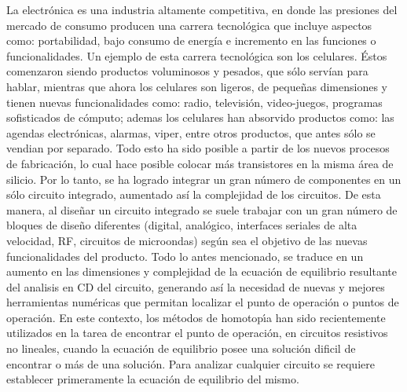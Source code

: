 \documentclass[conference,letterpaper,onecolumn]{IEEEtran}
\begin{document}
La electr\'onica es una industria altamente competitiva, en donde las presiones del mercado de consumo producen
una carrera tecnol\'ogica que incluye aspectos como: portabilidad, bajo consumo de energ{\'i}a e incremento en las funciones
o funcionalidades. Un ejemplo de esta carrera tecnol\'ogica son los celulares. \'Estos comenzaron siendo productos voluminosos y pesados,
que s\'olo serv{\'i}an para hablar, mientras que  ahora los celulares son ligeros, de peque\~nas dimensiones y tienen nuevas funcionalidades como: radio, televisi\'on, video-juegos, programas sofisticados de c\'omputo; ademas los celulares han absorvido productos como: las agendas electr\'onicas, alarmas, viper, entre otros productos, que antes s\'olo se vendian por separado. 
Todo esto ha sido posible a partir de los nuevos procesos de fabricaci\'on, lo cual hace posible colocar m\'as transistores en la misma \'area de silicio. Por lo tanto, se ha logrado integrar un gran n\'umero de componentes en un s\'olo circuito integrado, aumentado as{\'i} la complejidad de los circuitos. De esta manera, al dise\~nar un circuito integrado se suele trabajar con un gran n\'umero de bloques de dise\~no diferentes (digital, anal\'ogico, interfaces seriales de alta velocidad, RF, circuitos de microondas) seg\'un sea el objetivo de las nuevas funcionalidades del producto. 
Todo lo antes mencionado, se traduce en un aumento en las dimensiones y complejidad de la ecuaci\'on de equilibrio resultante del analisis en CD del circuito, generando as{\'i} la necesidad
de nuevas y mejores herramientas num\'ericas que permitan localizar el punto de operaci\'on  o puntos de operaci\'on. En este contexto, los m\'etodos de homotop\'{\i}a \cite{stat_1} han sido recientemente utilizados en
la tarea de encontrar el punto de operaci\'on, en circuitos resistivos no
lineales, cuando la ecuaci\'on de equilibrio posee una soluci\'on dificil de encontrar o m\'as de una
soluci\'on. Para analizar cualquier circuito se requiere establecer primeramente la
ecuaci\'on de equilibrio del mismo. 
\end{document}

